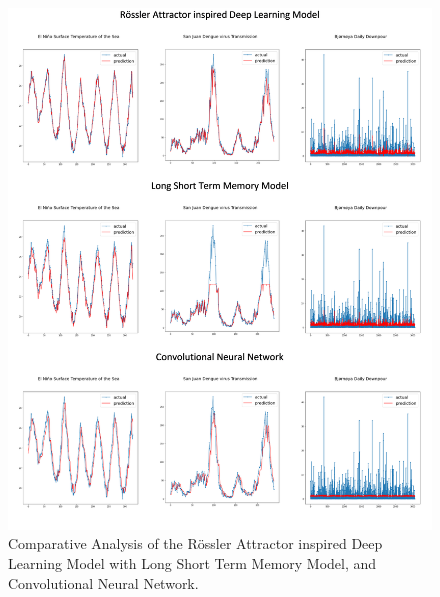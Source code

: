 \documentclass[conference]{IEEEtran}
\begin{document}
\begin{figure}[ht]
\centering
\centerline{\includegraphics[width = \linewidth]{13.png}}
\caption{Comparative Analysis of the Rössler Attractor inspired Deep Learning Model with Long Short Term Memory Model, and Convolutional Neural Network. }
\end{figure}
\end{document}
